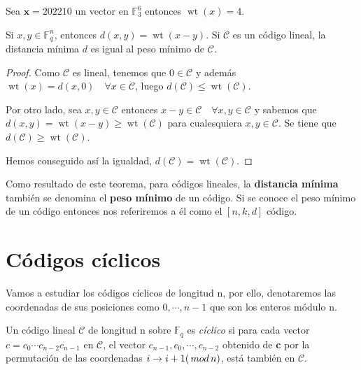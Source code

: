 \begin{exampleth}
	Sea $\mathbf{x} = 202210$ un vector en $\mathbb{F}_3^6$ entonces $\operatorname{wt}(x) = 4$.
\end{exampleth}

\begin{theorem}
Si $x,y \in \mathbb{F}_q^n$, entonces $d(x,y) = \operatorname{wt}(x-y)$. Si $\mathcal{C}$ es un código lineal, la distancia mínima $d$ es igual al peso mínimo de $\mathcal{C}$.
\end{theorem}

\begin{proof}
Como $\mathcal{C}$ es lineal, tenemos que $ 0 \in \mathcal{C}$ y además $\operatorname{wt}(x) = d(x,0) \quad \forall x \in \mathcal{C}$, luego $d(\mathcal{C}) \leq \operatorname{wt}(\mathcal{C})$.

Por otro lado, sea $x,y \in \mathcal{C}$ entonces $x-y \in \mathcal{C} \quad \forall x,y \in \mathcal{C}$ y sabemos que $d(x,y) = \operatorname{wt}(x-y) \geq \operatorname{wt}(\mathcal{C})$ para cualesquiera $x,y \in \mathcal{C}$. Se tiene que $d(\mathcal{C}) \geq \operatorname{wt}(\mathcal{C})$.

Hemos conseguido así la igualdad, $d(\mathcal{C}) = \operatorname{wt}(\mathcal{C})$.
\end{proof}

Como resultado de este teorema, para códigos lineales, la \textbf{ distancia mínima}  también se denomina el \textbf{peso mínimo} de un código. Si se conoce el peso mínimo de un código entonces nos referiremos a él como el $\left[n,k,d\right]$ código.


\section{Códigos cíclicos}

Vamos a estudiar los códigos cíclicos de longitud n, por ello, denotaremos las coordenadas de sus posiciones como $0,\cdots,n-1$ que son los enteros módulo n.

\begin{definition}
 Un código lineal $\mathcal{C}$ de longitud n sobre $\mathbb{F}_q$ es \textit{cíclico} si para cada vector $c = c_0\cdots c_{n-2}c_{n-1}$ en  $\mathcal{C}$, el vector $c_{n-1},c_0,\cdots,c_{n-2}$ obtenido de \textbf{c} por la permutación de las coordenadas $ i \rightarrow i+1 (\thinspace mod \thinspace n)$, está también en $\mathcal{C}$.
 \end{definition}
 
